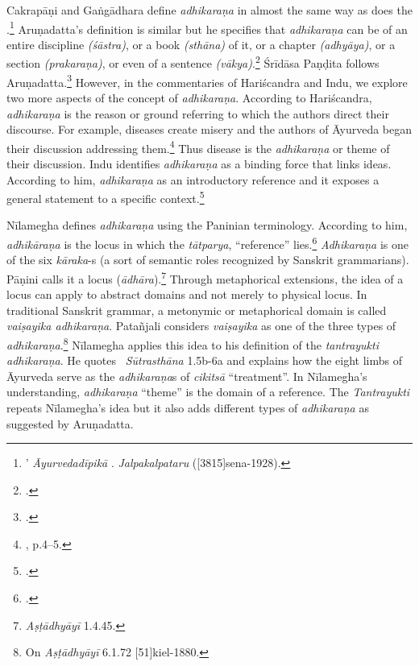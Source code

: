 Cakrapāṇi and Gaṅgādhara define \emph{adhikaraṇa} in almost the same way 
as does the \SS.\footnote{’ 
 \emph{Āyurvedadīpikā} 
\parencite[736]{cara-trikamji3}. 
 \emph{Jalpakalpataru} 
([3815]{sena-1928}).}
Aruṇadatta's definition is similar but he specifies that \emph{adhikaraṇa} can be 
of an entire discipline \emph{(śāstra)}, or a book \emph{(sthāna)} of it, or a 
chapter \emph{(adhyāya)}, or a section \emph{(prakaraṇa)}, or even of a 
sentence \emph{(vākya)}.\footnote{ \parencite[947]{kunt-1939}.}
Śrīdāsa Paṇḍita follows Aruṇadatta.\footcite[2]{muss-1940} 
However, in the commentaries of Hariścandra and Indu, we explore two more 
aspects of the concept of \emph{adhikaraṇa}. According to Hariścandra, 
\emph{adhikaraṇa} is the reason or ground referring to which the authors direct 
their discourse. For example, diseases create misery and the authors of Āyurveda 
began their discussion addressing them.\footnote{ , p.4--5.}
Thus disease is the \emph{adhikaraṇa} or theme of their discussion. Indu 
identifies \emph{adhikaraṇa} as a binding force that links ideas. According to 
him, 
\emph{adhikaraṇa} as an introductory reference and it exposes a general 
statement to a specific context.\footnote{ 
\parencite[959]{atha-1980}.} 

Nīlamegha defines \emph{adhikaraṇa} using the Paninian terminology. 
According to him, \emph{adhikāraṇa} is the locus in which the \emph{tātparya}, 
“reference” lies.\footnote{ 
\cite[1][2]{muth-1976}.} 
\emph{Adhikaraṇa} is one of the six \emph{kāraka}-s (a sort of semantic roles 
recognized by Sanskrit grammarians). 
Pāṇini calls it a locus (\emph{ādhāra}).\footnote{ 
\emph{Aṣṭādhyāyī} 1.4.45.} 
Through metaphorical extensions, the idea of a locus can apply to abstract 
domains and not merely to physical locus. 
In traditional Sanskrit grammar, a metonymic or metaphorical domain is called 
\emph{vaiṣayika adhikaraṇa}. 
Patañjali considers \emph{vaiṣayika} as one of the three types of 
\emph{adhikaraṇa}.\footnote{On \emph{Aṣṭādhyāyī} 6.1.72 
[51]{kiel-1880}.} 
Nīlamegha applies this idea to his definition of the \emph{tantrayukti} 
\emph{adhikaraṇa}. 
He quotes \AHS\ \emph{Sūtrasthāna} 1.5b-6a and explains how the eight limbs 
of Āyurveda serve as the \emph{adhikaraṇa}s of \emph{cikitsā} “treatment”. 
In Nīlamegha's understanding, \emph{adhikaraṇa} “theme” is the domain of a 
reference. 
The \emph{Tantrayukti} repeats Nīlamegha's idea but it also adds different types 
of \emph{adhikaraṇa} as suggested by Aruṇadatta. 

